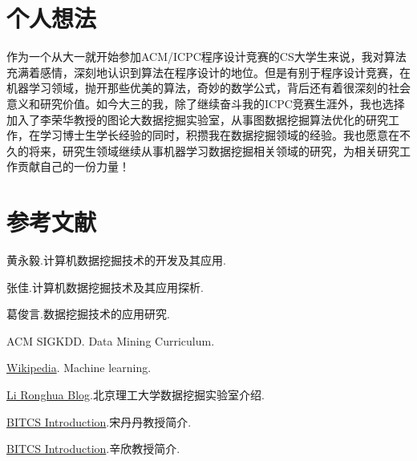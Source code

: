 \documentclass{elegantpaper}
\begin{document}
\section{个人想法}

作为一个从大一就开始参加ACM/ICPC程序设计竞赛的CS大学生来说，我对算法充满着感情，深刻地认识到算法在程序设计的地位。但是有别于程序设计竞赛，在机器学习领域，抛开那些优美的算法，奇妙的数学公式，背后还有着很深刻的社会意义和研究价值。如今大三的我，除了继续奋斗我的ICPC竞赛生涯外，我也选择加入了李荣华教授的图论大数据挖掘实验室，从事图数据挖掘算法优化的研究工作，在学习博士生学长经验的同时，积攒我在数据挖掘领域的经验。我也愿意在不久的将来，研究生领域继续从事机器学习数据挖掘相关领域的研究，为相关研究工作贡献自己的一份力量！

\section{参考文献}

\noindent [1] 黄永毅.计算机数据挖掘技术的开发及其应用.

\noindent [2] 张佳.计算机数据挖掘技术及其应用探析.

\noindent [3] 葛俊言.数据挖掘技术的应用研究.

\noindent [4] ACM SIGKDD. Data Mining Curriculum.

\noindent [5] \href{https://en.wikipedia.org/wiki/Machine_learning}{Wikipedia}. Machine learning.

\noindent [6] \href{https://ronghuali.github.io/}{Li Ronghua Blog}.北京理工大学数据挖掘实验室介绍.

\noindent [7] \href{http://cs.bit.edu.cn/szdw/jsml/js/sdd_20170821091432439000/index.htm}{BITCS Introduction}.宋丹丹教授简介.

\noindent [8] \href{http://cs.bit.edu.cn/szdw/jsml/fjs/xx/index.htm}{BITCS Introduction}.辛欣教授简介.
\end{document}
